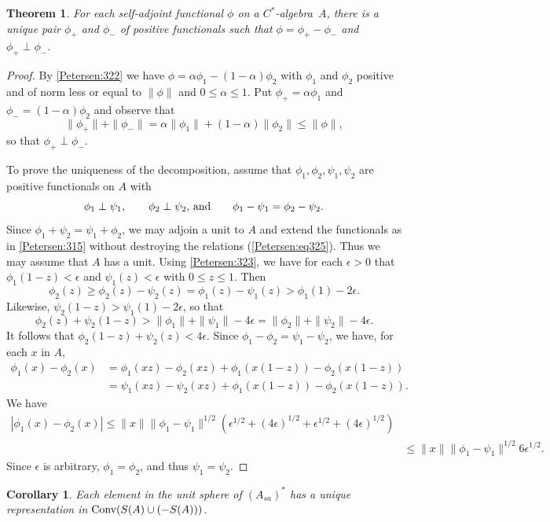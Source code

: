 \documentclass{book}
\newtheorem{theorem}[definition]{Theorem}
\newtheorem{corollary}[definition]{Corollary}
\def\cstar{\(C^*\)-algebra}
\begin{document}
\begin{theorem}\label{Petersen:325}
  For each self-adjoint functional \(\phi\) on a \cstar\ \(A\), there is a unique pair 
  \(\phi_+\) and \(\phi_-\) of positive functionals such that \(\phi=\phi_+-\phi_-\) and \(\phi_+\perp\phi_-\). 
\end{theorem}
\begin{proof}
  By \ref{Petersen:322} we have \(\phi=\alpha\phi_1-(1-\alpha)\phi_2\) with \(\phi_1\) and \(\phi_2\) positive and of norm less or equal to \(\left\|\phi\right\|\)
  and \(0\le \alpha \le 1\).
  Put \(\phi_+=\alpha\phi_1\) and \(\phi_-=(1-\alpha)\phi_2\) and observe that
  \[
    \|\phi_+\|+\|\phi_-\|=\alpha\|\phi_1\|+(1-\alpha)\|\phi_2\|\leq\|\phi\|,
  \]
  so that \(\phi_+\perp\phi_-\).\par
  To prove the uniqueness of the decomposition, assume that 
  \(\phi_1,\phi_2,\psi_1,\psi_2\) are positive functionals on \(A\) with
  \begin{equation}\label{Petersen:eq325}
    \phi_1\perp\psi_1,\qquad\phi_2\perp\psi_2\textnormal{, and}\qquad \phi_1-\psi_1=\phi_2-\psi_2.
  \end{equation} 
  Since \(\phi_1+\psi_2=\psi_1+\phi_2\), we may adjoin a unit to \(A\) and extend the functionals as in \ref{Petersen:315}
  without destroying the relations (\ref{Petersen:eq325}). Thus we may assume that \(A\) has a unit.
  Using \ref{Petersen:323}, we have for each \(\epsilon>0\) that \(\phi_1(1-z)<\epsilon\) and \(\psi_1(z)<\epsilon\)
  with \(0\leq z\leq1\). Then
  \[
    \phi_2(z)\geq\phi_2(z)-\psi_2(z)=\phi_1(z)-\psi_1(z)>\phi_1(1)-2\epsilon.
  \]
  Likewise, \(\psi_2(1-z)>\psi_1(1)-2\epsilon\), so that
  \[
    \phi_2(z)+\psi_2(1-z)>\|\phi_1\|+\|\psi_1\|-4\epsilon=\|\phi_2\|+\|\psi_2\|-4\epsilon.
  \]
  It follows that \(\phi_2(1-z)+\psi_2(z)<4\epsilon\). Since \(\phi_1-\phi_2=\psi_1-\psi_2\), we have, for each \(x\) in \(A\),
  \begin{align*}
    \phi_1(x)-\phi_2(x)&=\phi_1(xz)-\phi_2(xz)+\phi_1(x(1-z))-\phi_2(x(1-z))\\
    &=\psi_1(xz)-\psi_2(xz)+\phi_1(x(1-z))-\phi_2(x(1-z)).
  \end{align*}
  We have
  \begin{align*}
    |\phi_1(x)-\phi_2(x)|\leq\|x\|\|\phi_1-\psi_1\|^{1/2}(\epsilon^{1/2}+(4\epsilon)^{1/2}+\epsilon^{1/2}+(4\epsilon)^{1/2})\\
    &\leq\|x\|\|\phi_1-\psi_1\|^{1/2}6\epsilon^{1/2}.
  \end{align*}
  Since \(\epsilon\) is arbitrary, \(\phi_1=\phi_2\), and thus \(\psi_1=\psi_2\).
\end{proof}
\begin{corollary}\label{Petersen:326}
  Each element in the unit sphere of \((A_{sa})^*\)  has a unique representation in \(\textnormal{Conv}(S(A)\cup(-S(A)))\).
\end{corollary}
\end{document}
